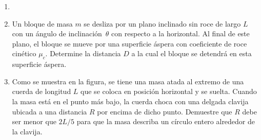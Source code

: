 \documentclass[letterpaper,11pt]{article}
\begin{document}
\vspace{-1cm}
\begin{enumerate}\setlength{\itemsep}{0.4cm}\addtocounter{enumi}{0}


\item[]

\item Un bloque de masa $m$ se desliza por un plano inclinado sin roce de largo $L$ con un ángulo de inclinación~$\theta$ con respecto a la horizontal. Al final de este plano, el bloque se mueve por una superficie áspera con coeficiente de roce cinético $\mu_c$. Determine la distancia $D$ a la cual el bloque se detendrá en esta superficie áspera.

\begin{figure}[htbp]
  \centering
  
\end{figure}

\item Como se muestra en la figura, se tiene una masa atada al extremo de una cuerda de longitud $L$ que se coloca en posición horizontal y se suelta. Cuando la masa está en el punto más bajo, la cuerda choca con una delgada clavija ubicada a una distancia $R$ por encima de dicho punto. Demuestre que $R$ debe ser menor que $2L/5$ para que la masa describa un círculo entero alrededor de la clavija.

\begin{figure}[H]
  \centering
  
\end{figure}

%   

\end{enumerate}
\end{document}
